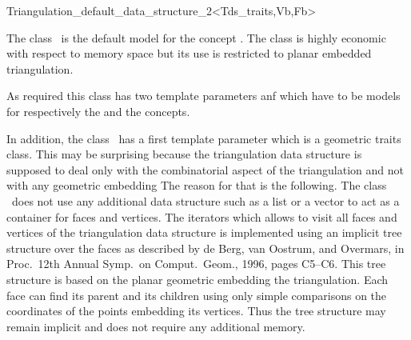

\begin{ccRefClass}{Triangulation_default_data_structure_2<Tds_traits,Vb,Fb>} 


\ccDefinition
  
The class \ccRefName\ is the default model for the concept
.
The class \ccRefName 
is highly economic with respect to memory space but its use is
restricted
to planar embedded triangulation.

As required this class has two template parameters  anf 
which have 
to be models for respectively the
 and 
the  concepts.

In addition, the class \ccClassTemplateName\ has a first template parameter
which is a geometric traits class. This may be surprising because
the triangulation data structure is supposed to deal only with the combinatorial
aspect of the triangulation and not with any geometric embedding
The reason for that is the following.
The class \ccRefName\ does not use any additional data structure
such as a list or a vector to act as a container for faces and vertices.
The iterators which allows to visit all faces and vertices of the
triangulation
data structure
is implemented using  an implicit tree structure over the faces
as described by
 de Berg, van Oostrum, and Overmars, 
in Proc.\ 12th Annual Symp.\ on Comput.\ Geom.,
1996, pages C5--C6. This tree structure is  based on the planar
geometric embedding
the triangulation. Each face 
 can find its parent 
and its children using only simple comparisons on the
coordinates of the points embedding its vertices.
Thus the tree structure may remain implicit 
and does not require any additional memory. 


\end{ccRefClass}
